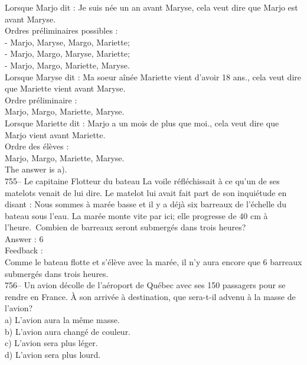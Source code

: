 \documentclass[letterpaper, 12pt]{article}
\begin{document}
Lorsque Marjo dit : \og Je suis n\'ee un an avant Maryse\fg , cela
veut dire que Marjo est avant Maryse.\\

Ordres pr\'eliminaires possibles :\\
- Marjo, Maryse, Margo, Mariette;\\
- Marjo, Margo, Maryse, Mariette;\\
- Marjo, Margo, Mariette, Maryse.\\

Lorsque Maryse dit : \og Ma soeur a\^in\'ee Mariette vient d'avoir
18 ans.\fg , cela veut dire  que Mariette vient avant Maryse.\\

Ordre pr\'eliminaire :\\
Marjo, Margo, Mariette, Maryse.\\

Lorsque Mariette dit : \og Marjo a un mois de plus que moi.\fg ,
cela veut dire que Marjo vient avant Mariette.\\

Ordre des \'el\`eves :\\
Marjo, Margo, Mariette, Maryse.\\

The answer is a).\\

755-- Le capitaine Flotteur du bateau La voile r\'efl\'echissait \`a
ce qu'un de ses matelots venait de lui dire.  Le matelot lui avait
fait part de son inqui\'etude en disant : \og Nous sommes \`a
mar\'ee basse et il y a d\'ej\`a  six barreaux de l'\'echelle du
bateau sous l'eau.  La mar\'ee monte vite par ici; elle progresse de
40 cm \`a l'heure.\fg\  Combien de
barreaux seront submerg\'es dans trois heures?\\


Answer : 6\\

Feedback : \\
Comme le bateau flotte et s'\'el\`eve avec la mar\'ee, il n'y aura encore
que 6 barreaux submerg\'es dans trois heures.\\

756-- Un avion d\'ecolle de l'a\'eroport de Qu\'ebec avec ses 150 passagers
pour se rendre en France.  \`A son arriv\'ee \`a destination, que sera-t-il
advenu \`a la masse de l'avion?\\
a) L'avion aura la m\^eme masse.\\
b) L'avion aura chang\'e de couleur.\\
c) L'avion sera plus l\'eger.\\
d) L'avion sera plus lourd.\\
\end{document}
